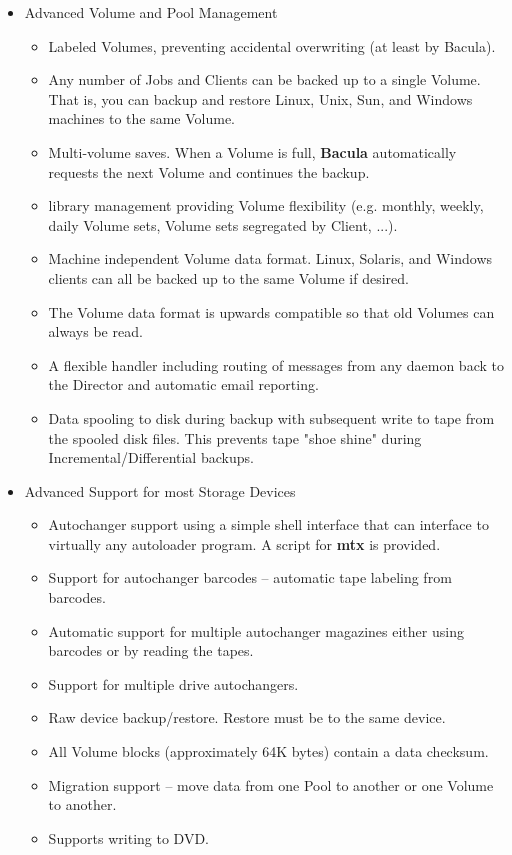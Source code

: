 \begin{itemize}
\item Advanced Volume and Pool Management
   \begin{itemize}
   \item Labeled Volumes, preventing accidental overwriting  (at least by
      Bacula).  
   \item Any number of Jobs and Clients can be backed up to a single  Volume.
      That is, you can backup and restore Linux, Unix, Sun, and  Windows machines to
      the same Volume.  
   \item Multi-volume saves. When a Volume is full, {\bf Bacula}  automatically
      requests the next Volume and continues the backup.  
   \item 
       library management 
      providing Volume flexibility (e.g. monthly, weekly, daily Volume sets,  Volume
      sets segregated by Client, ...). 
   \item Machine independent Volume data format. Linux, Solaris, and Windows 
      clients can all be backed up to the same Volume if desired. 
   \item The Volume data format is upwards compatible so that old Volumes
      can always be read.
   \item A flexible 
        handler including routing
      of messages from any daemon back to the  Director and automatic email
      reporting.  
   \item Data spooling to disk during backup with subsequent write to tape from
      the spooled disk files. This prevents tape "shoe shine"  during
      Incremental/Differential backups.  
   \end{itemize}

\item Advanced Support for most Storage Devices
    \begin{itemize}
   \item Autochanger support using a simple shell interface that can interface 
      to virtually any autoloader program. A script for {\bf mtx} is  provided.  
   \item Support for autochanger barcodes -- automatic tape labeling from 
      barcodes.  
   \item Automatic support for multiple autochanger magazines either using
      barcodes or by reading the tapes.  
   \item Support for multiple drive autochangers.
   \item Raw device backup/restore. Restore must be to the same device. 
   \item All Volume blocks (approximately 64K bytes) contain a data checksum.  
   \item Migration support -- move data from one Pool to another or
         one Volume to another.
   \item Supports writing to DVD.
   \end{itemize}


\end{itemize}
